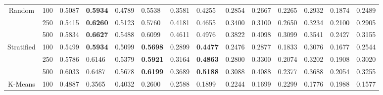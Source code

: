 \documentclass[preprint,12pt]{elsarticle}
\begin{document}
\begin{table}[!t]
{\begin{tabular}{cc|cc|cc|cc|cc|cc|cc}
Random                    & 100      & 0.5087          & \multicolumn{1}{l|}{\textbf{0.5934}} & 0.4789          & \multicolumn{1}{l|}{0.5538}          & 0.3581          & \multicolumn{1}{l|}{0.4255}          & 0.2854          & \multicolumn{1}{l|}{0.2667}          & 0.2265          & \multicolumn{1}{l|}{0.2932}          & 0.1874          & 0.2489          \\
                          & 250      & 0.5415          & \multicolumn{1}{l|}{\textbf{0.6260}} & 0.5123          & \multicolumn{1}{l|}{0.5760}          & 0.4181          & \multicolumn{1}{l|}{0.4655}          & 0.3400          & \multicolumn{1}{l|}{0.3100}          & 0.2650          & \multicolumn{1}{l|}{0.3234}          & 0.2100          & 0.2905          \\
                          & 500      & 0.5834          & \multicolumn{1}{l|}{\textbf{0.6627}} & 0.5488          & \multicolumn{1}{l|}{0.6099}          & 0.4611          & \multicolumn{1}{l|}{0.4976}          & 0.3822          & \multicolumn{1}{l|}{0.4098}          & 0.3099          & \multicolumn{1}{l|}{0.3541}          & 0.2427          & 0.3155          \\ \hline
Stratified                & 100      & 0.5499          & \multicolumn{1}{l|}{\textbf{0.5934}} & 0.5099          & \multicolumn{1}{l|}{\textbf{0.5698}} & 0.2899          & \multicolumn{1}{l|}{\textbf{0.4477}} & 0.2476          & \multicolumn{1}{l|}{0.2877}          & 0.1833          & \multicolumn{1}{l|}{0.3076}          & 0.1677          & 0.2544          \\
                          & 250      & 0.5786          & \multicolumn{1}{l|}{0.6146}          & 0.5379          & \multicolumn{1}{l|}{\textbf{0.5921}} & 0.3164          & \multicolumn{1}{l|}{\textbf{0.4863}} & 0.2800          & \multicolumn{1}{l|}{0.3300}          & 0.2074          & \multicolumn{1}{l|}{0.3202}          & 0.1908          & 0.3020          \\
                          & 500      & 0.6033          & \multicolumn{1}{l|}{0.6487}          & 0.5678          & \multicolumn{1}{l|}{\textbf{0.6199}} & 0.3689          & \multicolumn{1}{l|}{\textbf{0.5188}} & 0.3088          & \multicolumn{1}{l|}{0.4088}          & 0.2377          & \multicolumn{1}{l|}{0.3688}          & 0.2054          & 0.3255          \\ \hline
K-Means                   & 100      & 0.4887          & \multicolumn{1}{l|}{0.3565}          & 0.4032          & \multicolumn{1}{l|}{0.2600}          & 0.2588          & \multicolumn{1}{l|}{0.1899}          & 0.2244          & \multicolumn{1}{l|}{0.1699}          & 0.2299          & \multicolumn{1}{l|}{0.1776}          & 0.1988          & 0.1577          \\

\end{tabular}}
\end{table}
\end{document}
